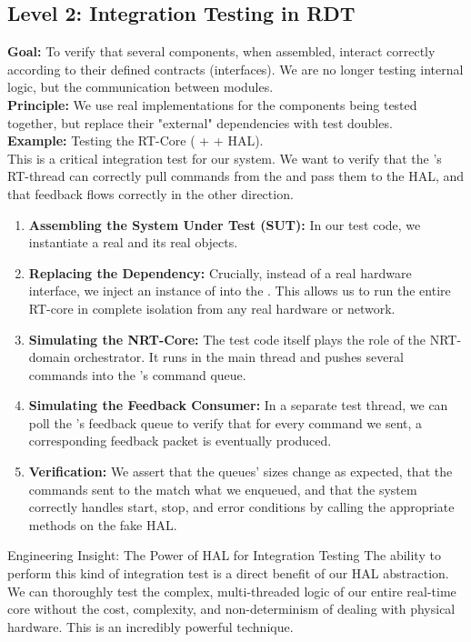 
\subsection*{Level 2: Integration Testing in RDT}
\label{subsec:integration_testing}

\textbf{Goal:} To verify that several components, when assembled, interact correctly according to their defined contracts (interfaces). We are no longer testing internal logic, but the communication between modules.\\
\textbf{Principle:} We use real implementations for the components being tested together, but replace their "external" dependencies with test doubles.\\
\textbf{Example:} Testing the RT-Core ( +  + HAL).\\
This is a critical integration test for our system. We want to verify that the 's RT-thread can correctly pull commands from the  and pass them to the HAL, and that feedback flows correctly in the other direction.
        \begin{enumerate}
            \item \textbf{Assembling the System Under Test (SUT):} In our test code, we instantiate a real  and its real  objects.
            \item \textbf{Replacing the Dependency:} Crucially, instead of a real hardware interface, we inject an instance of \textbf{} into the . This allows us to run the entire RT-core in complete isolation from any real hardware or network.
            \item \textbf{Simulating the NRT-Core:} The test code itself plays the role of the NRT-domain orchestrator. It runs in the main thread and pushes several  commands into the 's command queue.
            \item \textbf{Simulating the Feedback Consumer:} In a separate test thread, we can poll the 's feedback queue to verify that for every command we sent, a corresponding feedback packet is eventually produced.
            \item \textbf{Verification:} We assert that the queues' sizes change as expected, that the commands sent to the  match what we enqueued, and that the system correctly handles start, stop, and error conditions by calling the appropriate methods on the fake HAL.
        \end{enumerate}
\begin{tipbox}{Engineering Insight: The Power of HAL for Integration Testing}
The ability to perform this kind of integration test is a direct benefit of our HAL abstraction. We can thoroughly test the complex, multi-threaded logic of our entire real-time core without the cost, complexity, and non-determinism of dealing with physical hardware. This is an incredibly powerful technique.
\end{tipbox}


